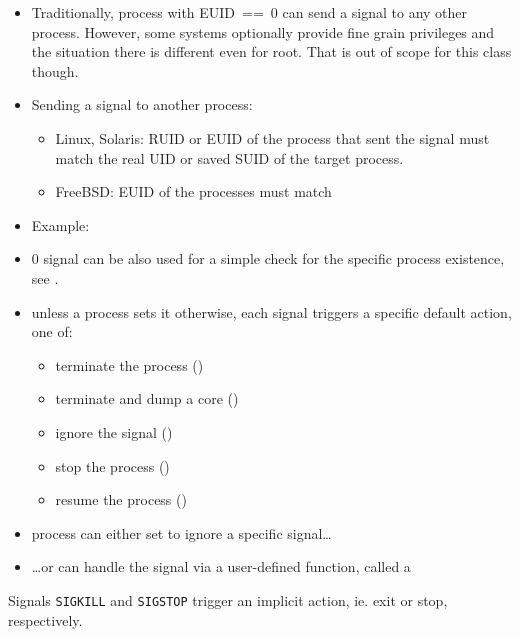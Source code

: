 \label{KILLSYSCALL}

\begin{itemize}
\item Traditionally, process with EUID~==~0 can send a signal to any other
process.  However, some systems optionally provide fine grain privileges and the
situation there is different even for root.  That is out of scope for this class
though.  \item Sending a signal to another process:
    \begin{itemize}
    \item Linux, Solaris: RUID or EUID of the process that sent the signal must
    match the real UID or saved SUID of the target process.
    \item FreeBSD: EUID of the processes must match
    \end{itemize}
\item Example: 
\item 0 signal can be also used for a simple check for the specific process
existence, see .
\end{itemize}



\begin{slide}
\begin{itemize}
\item unless a process sets it otherwise, each signal triggers a specific
default action, one of:
    \begin{itemize}
    \item terminate the process () 
    \item terminate and dump a core ()
    \item ignore the signal ()
    \item stop the process ()
    \item resume the process () 
    \end{itemize}
\item process can either set to ignore a specific signal\dots
\item \dots{}or can handle the signal via a user-defined function,
called a 
\end{itemize}

Signals \texttt{SIGKILL} and \texttt{SIGSTOP}  trigger an implicit
action, ie. exit or stop, respectively.
\end{slide}

